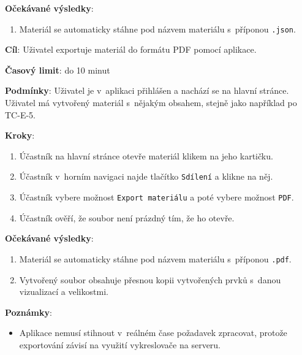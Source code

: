 \textbf{Očekávané výsledky}:

\begin{enumerate}[leftmargin=1.4cm]
    \item Materiál se automaticky stáhne pod názvem materiálu s~příponou \verb|.json|.
\end{enumerate}




\vspace{1em}

\textbf{Cíl}: Uživatel exportuje materiál do formátu PDF pomocí aplikace.

\textbf{Časový limit}: do 10 minut

\textbf{Podmínky}:  Uživatel je v~aplikaci přihlášen a nachází se na hlavní stránce. Uživatel má vytvořený materiál s~nějakým obsahem, stejně jako například po TC-E-5.

\textbf{Kroky}:

\begin{enumerate}[leftmargin=1.4cm]
    \item Účastník na hlavní stránce otevře materiál klikem na jeho kartičku.
    \item Účastník v~horním navigaci najde tlačítko \verb|Sdílení| a klikne na něj.
    \item Účastník vybere možnost \verb|Export materiálu| a poté vybere možnost \verb|PDF|.
    \item Účastník ověří, že soubor není prázdný tím, že ho otevře.
\end{enumerate}

\textbf{Očekávané výsledky}:

\begin{enumerate}[leftmargin=1.4cm]
    \item Materiál se automaticky stáhne pod názvem materiálu s~příponou \verb|.pdf|.
    \item Vytvořený soubor obsahuje přesnou kopii vytvořených prvků s~danou vizualizací a velikostmi.
\end{enumerate}

\textbf{Poznámky}:

\begin{itemize}[leftmargin=1.4cm]
    \item Aplikace nemusí stihnout v~reálném čase požadavek zpracovat, protože exportování závisí na využití vykreslovače na serveru.
\end{itemize}





